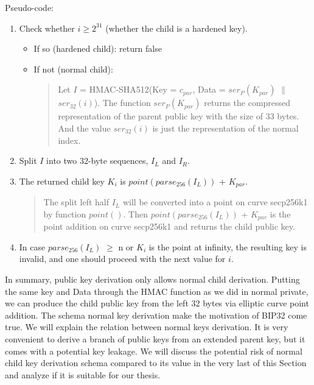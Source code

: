 Pseudo-code:
\begin{enumerate}
    \item Check whether $i \geq 2^{31}$ (whether the child is a hardened key).
          \begin{itemize}
              \item If so (hardened child): return false

              \item If not (normal child):
                    \begin{quote}

                        Let $I$ = HMAC-SHA512(Key = $c_{par}$, Data = $ser_{P}(K_{par})$ $\parallel$ $ser_{32}(i)$).
                        The function $ser_{P}(K_{par})$ returns the compressed representation of the parent public key with the size of 33 bytes. And the value $ser_{32}(i)$ is just the representation of the normal index.
                    \end{quote}
          \end{itemize}
          \bigskip

    \item Split $I$ into two 32-byte sequences, $I_L$ and $I_R$.
          \bigskip

    \item The returned child key $K_i$ is $point(parse_{256}(I_L))$ + $K_{par}$.

          \begin{quote}
              The split left half $I_L$ will be converted into a point on curve secp256k1 by function $point()$. Then $point(parse_{256}(I_L))$ + $K_{par}$ is the point addition on curve secp256k1 and returns the child public key.
          \end{quote}
          \bigskip

    \item In case $parse_{256}(I_L)$ $\geq$ n or $K_i$ is the point at infinity, the resulting key is invalid, and one should proceed with the next value for $i$.

\end{enumerate}

In summary, public key derivation only allows normal child derivation.
Putting the same key and Data through the HMAC function as we did in normal private, we can produce the child public key from the left 32 bytes via elliptic curve point addition.
The schema normal key derivation make the motivation of BIP32 come true. We will explain the relation between normal keys derivation.
It is very convenient to derive a branch of public keys from an extended parent key, but it comes with a potential key leakage.
We will discuss the potential risk of normal child key derivation schema compared to its value in the very last of this Section and analyze if it is suitable for our thesis.


